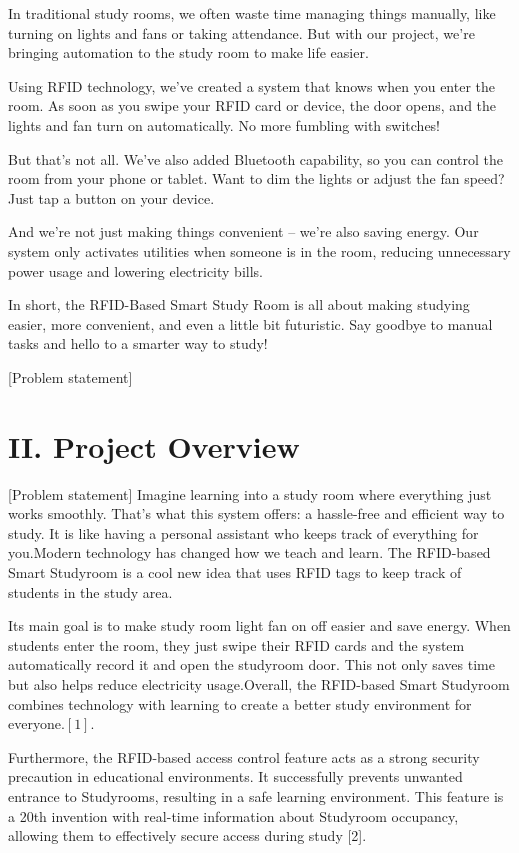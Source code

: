 \documentclass[conference]{IEEEtran}
\begin{document}
In traditional study rooms, we often waste time managing things manually, like turning on lights and fans or taking attendance. But with our project, we're bringing automation to the study room to make life easier.

Using RFID technology, we've created a system that knows when you enter the room. As soon as you swipe your RFID card or device, the door opens, and the lights and fan turn on automatically. No more fumbling with switches!

But that's not all. We've also added Bluetooth capability, so you can control the room from your phone or tablet. Want to dim the lights or adjust the fan speed? Just tap a button on your device.

And we're not just making things convenient – we're also saving energy. Our system only activates utilities when someone is in the room, reducing unnecessary power usage and lowering electricity bills.

In short, the RFID-Based Smart Study Room is all about making studying easier, more convenient, and even a little bit futuristic. Say goodbye to manual tasks and hello to a smarter way to study!

[Problem statement] 

\section*{II. Project Overview}

[Problem statement]
Imagine learning  into a study room where everything just works smoothly. That's what this system offers: a hassle-free and efficient way to study. It is like having a personal assistant who keeps track of everything for you.Modern technology has changed how we teach and learn. The RFID-based Smart Studyroom is a cool new idea that uses RFID tags to keep track of students in the study area.

Its main goal is to make study room light fan on off easier and save energy. When students enter the room, they just swipe their RFID cards and the system automatically record it and open the studyroom door. This not only saves time but also helps reduce electricity usage.Overall, the RFID-based Smart Studyroom combines technology with learning to create a better study environment for everyone.$[1]$.

Furthermore, the RFID-based access control feature acts as a strong security precaution in educational environments. It successfully prevents unwanted entrance to Studyrooms, resulting in a safe learning environment. This feature is a 20th invention with real-time information about Studyroom occupancy, allowing them to effectively secure access during study [2].
\end{document}
